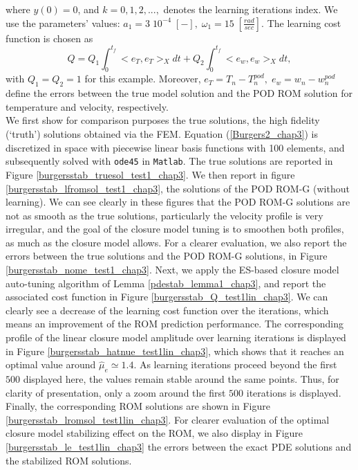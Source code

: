 \documentclass[letterpaper,conference,onecolumn,11pt]{IEEEtran}
\begin{document}
 where $y(0)=0$, and $k=0,1,2,...,$ denotes the learning iterations index. We use the
 parameters' values: $a_{1}=3\;10^{-4}\;[-],\;\omega_{1}=15\;[\frac{rad}{sec}]$. The learning
cost function is chosen as
\begin{equation}\label{Re_estim_Q1_chap3_}
Q=Q_1\int_{0}^{t_{f}}<e_{T},e_{T}>_{X}dt+Q_2\int_{0}^{t_{f}}<e_{w},e_{w}>_{X}dt,
\end{equation}
with $Q_{1}=Q_{2}=1$ for this example. Moreover,
$e_{T}=T_{n}-T^{pod}_{n},\;e_{w}=w_{n}-w^{pod}_{n}$ define the
errors between the true model solution and the POD ROM solution
for temperature and velocity, respectively.\\We first show for
comparison purposes the true solutions, the high fidelity
(`truth') solutions obtained via the FEM. Equation
(\ref{Burgers2_chap3}) is discretized in space with piecewise
linear basis functions with 100 elements, and subsequently solved
with \texttt{ode45} in \texttt{Matlab}\textregistered. The true
solutions are reported in Figure
\ref{burgersstab_truesol_test1_chap3}. We then report in figure
\ref{burgersstab_lfromsol_test1_chap3}, the solutions of the POD
ROM-G (without learning). We can see clearly in these figures that
the POD ROM-G solutions are not as smooth as the true solutions,
particularly the velocity profile is very irregular, and the goal
of the closure model tuning is to smoothen both profiles, as much
as the closure model allows. For a clearer evaluation, we also
report the errors between the true solutions and the POD ROM-G
solutions, in Figure \ref{burgersstab_nome_test1_chap3}. Next, we
apply the ES-based closure model auto-tuning algorithm of Lemma
\ref{pdestab_lemma1_chap3}, and report the associated cost
function in Figure \ref{burgersstab_Q_test1lin_chap3}. We can
clearly see a decrease of the learning cost function over the
iterations, which means an improvement of the ROM prediction
performance. The corresponding profile of the linear closure model
amplitude over learning iterations is displayed in Figure
\ref{burgersstab_hatnue_test1lin_chap3}, which shows that it
reaches an optimal value around $\hat{\mu}_{e}\simeq 1.4$.  As
learning iterations proceed beyond the first $500$ displayed here,
the values remain stable around the same points. Thus, for clarity
of presentation, only a zoom around the first $500$ iterations is
displayed. Finally, the corresponding ROM solutions are shown in
Figure \ref{burgersstab_lromsol_test1lin_chap3}. For clearer
evaluation of the optimal closure model stabilizing effect on the
ROM, we also display in Figure \ref{burgersstab_le_test1lin_chap3}
the errors between the exact PDE solutions and the stabilized ROM
solutions.
\end{document}
